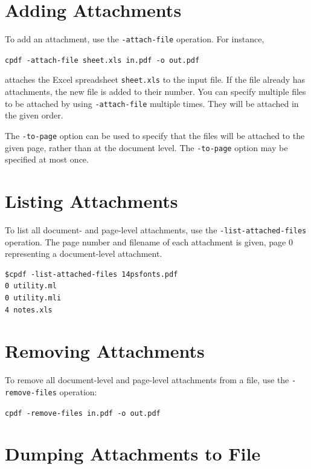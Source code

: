\documentclass{book}
\begin{document}
  \section{Adding Attachments}
  To add an attachment, use the \texttt{-attach-file} operation. For instance,

  \begin{framed}
  \noindent\small\verb!cpdf -attach-file sheet.xls in.pdf -o out.pdf!
  \end{framed}

  \noindent attaches the Excel spreadsheet \texttt{sheet.xls} to the input file. If the file already has attachments, the new file is added to their number. You can specify multiple files to be attached by using \verb!-attach-file! multiple times. They will be attached in the given order.
  
  The \texttt{-to-page} option can be used to specify that the files will be attached to the given page, rather than at the document level. The \texttt{-to-page} option may be specified at most once. 

\section{Listing Attachments}
To list all document- and page-level attachments, use the \texttt{-list-attached-files} operation. The page number and filename of each attachment is given, page 0 representing a document-level attachment.

\begin{framed}
{\small\begin{verbatim}
$cpdf -list-attached-files 14psfonts.pdf
0 utility.ml
0 utility.mli
4 notes.xls
\end{verbatim}}
\end{framed}

  \section{Removing Attachments}
   To remove all document-level and page-level attachments from a file, use the \texttt{-remove-files} operation:

  \begin{framed}
    \noindent\small\verb!cpdf -remove-files in.pdf -o out.pdf!
  \end{framed}

\section{Dumping Attachments to File}
\end{document}
